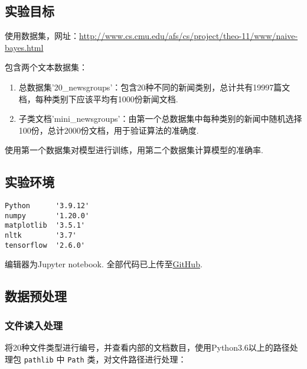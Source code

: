 \documentclass[
]{article}
\author{}
\date{}
\begin{document}
\hypertarget{ux5b9eux9a8cux76eeux6807}{%
\subsection{实验目标}\label{ux5b9eux9a8cux76eeux6807}}

使用数据集，网址：\url{http://www.cs.cmu.edu/afs/cs/project/theo-11/www/naive-bayes.html}

包含两个文本数据集：

\begin{enumerate}
\def\labelenumi{\arabic{enumi}.}
\item
  总数据集'20\_newsgroups'：包含20种不同的新闻类别，总计共有19997篇文档，每种类别下应该平均有1000份新闻文档.
\item
  子类文档'mini\_newsgroups'：由第一个总数据集中每种类别的新闻中随机选择100份，总计2000份文档，用于验证算法的准确度.
\end{enumerate}

使用第一个数据集对模型进行训练，用第二个数据集计算模型的准确率.

\hypertarget{ux5b9eux9a8cux73afux5883}{%
\subsection{实验环境}\label{ux5b9eux9a8cux73afux5883}}

\begin{verbatim}
Python		'3.9.12'
numpy		'1.20.0'
matplotlib	'3.5.1'
nltk		'3.7'
tensorflow	'2.6.0'
\end{verbatim}

编辑器为Jupyter notebook.
全部代码已上传至\href{https://github.com/wty-yy/LaTex-Projects/blob/main/NLP/hw2/code/main.ipynb}{GitHub}.

\hypertarget{ux6570ux636eux9884ux5904ux7406}{%
\subsection{数据预处理}\label{ux6570ux636eux9884ux5904ux7406}}

\hypertarget{ux6587ux4ef6ux8bfbux5165ux5904ux7406}{%
\subsubsection{文件读入处理}\label{ux6587ux4ef6ux8bfbux5165ux5904ux7406}}

将20种文件类型进行编号，并查看内部的文档数目，使用Python3.6以上的路径处理包
\texttt{pathlib} 中 \texttt{Path} 类，对文件路径进行处理：
\end{document}
